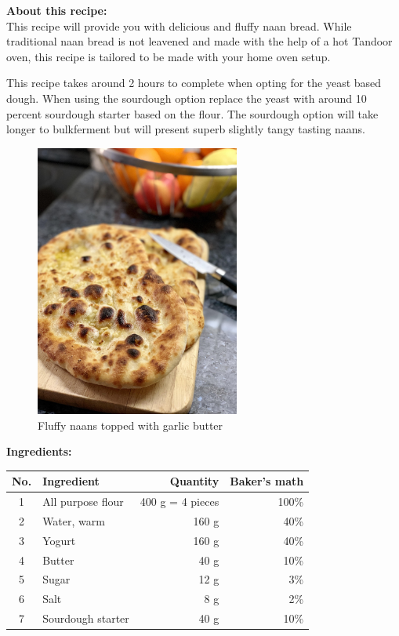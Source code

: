\noindent\textbf{About this recipe:}\\
This recipe will provide you with delicious and fluffy naan bread.
While traditional naan bread is not leavened and made with the help of
a hot Tandoor oven, this recipe is tailored to be made with your
home oven setup.

This recipe takes around 2 hours to complete when opting for the yeast based
dough. When using the sourdough option replace the yeast with around 10
percent sourdough starter based on the flour. The sourdough option will take
longer to bulkferment but will present superb slightly tangy tasting naans.

\begin{figure}[h]
    \centering
    \includegraphics[width=0.6\textwidth]{naan}
    \caption{Fluffy naans topped with garlic butter}
\end{figure}

\noindent\textbf{Ingredients:}

\begin{center}
\begin{tabular}{|c|l|r|r|}
    \hline
    \textbf{No.} & \textbf{Ingredient} & \textbf{Quantity} & \textbf{Baker's math} \\
    \hline
    1 & All purpose flour & 400 g = 4 pieces & 100\% \\
    \hline
    2 & Water, warm & 160 g & 40\% \\
    \hline
    3 & Yogurt & 160 g & 40\% \\
    \hline
    4 & Butter & 40 g & 10\% \\
    \hline
    5 & Sugar & 12 g & 3\% \\
    \hline
    6 & Salt & 8 g & 2\% \\
    \hline
    7 & Sourdough starter & 40 g & 10\% \\
    \hline
\end{tabular}
\end{center}

